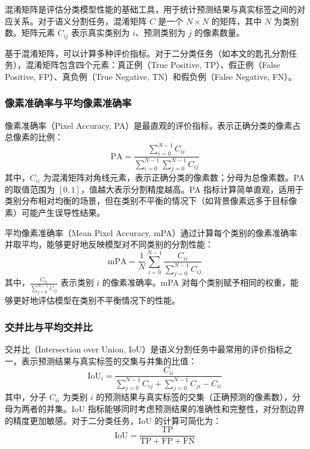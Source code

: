 混淆矩阵是评估分类模型性能的基础工具，用于统计预测结果与真实标签之间的对应关系。对于语义分割任务，混淆矩阵 $C$ 是一个 $N \times N$ 的矩阵，其中 $N$ 为类别数。矩阵元素 $C_{ij}$ 表示真实类别为 $i$、预测类别为 $j$ 的像素数量。

基于混淆矩阵，可以计算多种评价指标。对于二分类任务（如本文的匙孔分割任务），混淆矩阵包含四个元素：真正例（True Positive, TP）、假正例（False Positive, FP）、真负例（True Negative, TN）和假负例（False Negative, FN）。

\subsubsection{像素准确率与平均像素准确率}

像素准确率（Pixel Accuracy, PA）是最直观的评价指标，表示正确分类的像素占总像素的比例：
\begin{equation}
\text{PA} = \frac{\sum_{i=0}^{N-1} C_{ii}}{\sum_{i=0}^{N-1} \sum_{j=0}^{N-1} C_{ij}}
\label{eq:pixel_accuracy}
\end{equation}
其中，$C_{ii}$ 为混淆矩阵对角线元素，表示正确分类的像素数；分母为总像素数。PA 的取值范围为 $[0, 1]$，值越大表示分割精度越高。PA 指标计算简单直观，适用于类别分布相对均衡的场景，但在类别不平衡的情况下（如背景像素远多于目标像素）可能产生误导性结果。

平均像素准确率（Mean Pixel Accuracy, mPA）通过计算每个类别的像素准确率并取平均，能够更好地反映模型对不同类别的分割性能：
\begin{equation}
\text{mPA} = \frac{1}{N} \sum_{i=0}^{N-1} \frac{C_{ii}}{\sum_{j=0}^{N-1} C_{ij}}
\label{eq:mean_pixel_accuracy}
\end{equation}
其中，$\frac{C_{ii}}{\sum_{j=0}^{N-1} C_{ij}}$ 表示类别 $i$ 的像素准确率。mPA 对每个类别赋予相同的权重，能够更好地评估模型在类别不平衡情况下的性能。

\subsubsection{交并比与平均交并比}

交并比（Intersection over Union, IoU）是语义分割任务中最常用的评价指标之一，表示预测结果与真实标签的交集与并集的比值：
\begin{equation}
\text{IoU}_i = \frac{C_{ii}}{\sum_{j=0}^{N-1} C_{ij} + \sum_{j=0}^{N-1} C_{ji} - C_{ii}}
\label{eq:iou}
\end{equation}
其中，分子 $C_{ii}$ 为类别 $i$ 的预测结果与真实标签的交集（正确预测的像素数），分母为两者的并集。IoU 指标能够同时考虑预测结果的准确性和完整性，对分割边界的精度更加敏感。对于二分类任务，IoU 的计算可简化为：
\begin{equation}
\text{IoU} = \frac{\text{TP}}{\text{TP} + \text{FP} + \text{FN}}
\label{eq:iou_binary}
\end{equation}

